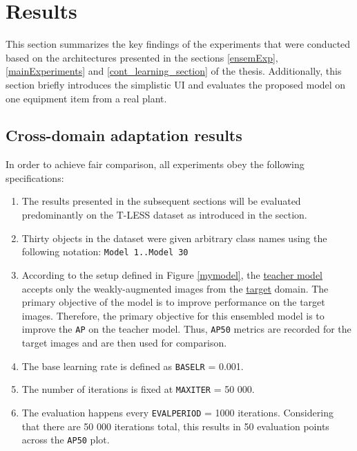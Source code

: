 

\section{Results} 
\label{results} 
This section summarizes the key findings of the experiments that were conducted based on the architectures presented in the sections \ref{ensemExp},  \ref{mainExperiments} and \ref{cont_learning_section} of the thesis. Additionally, this section briefly introduces the simplistic UI and evaluates the proposed model on one equipment item from a real plant. 

\subsection{Cross-domain adaptation results}

In order to achieve fair comparison, all experiments obey the following specifications:
\begin{enumerate}
\item The results presented in the subsequent sections will be evaluated predominantly on the T-LESS dataset as introduced in the  section. 
\item Thirty objects in the dataset were given arbitrary class names using the following notation: \texttt{Model 1..Model 30}
\item According to the setup defined in Figure \ref{mymodel}, the \underline{teacher model} accepts only the weakly-augmented images from the \underline{target} domain. The primary objective of the model is to improve performance on the target images. Therefore, the primary objective for this ensembled model is to improve the \texttt{AP} on the teacher model. Thus, \texttt{AP50} metrics are recorded for the target images and are then used for comparison. 
\item The base learning rate is defined as \texttt{BASE\textunderscore LR} = 0.001.
\item The number of iterations is fixed at \texttt{MAX\textunderscore ITER} = 50 000.
\item The evaluation happens every \texttt{EVAL\textunderscore PERIOD} = 1000 iterations. Considering that there are 50 000 iterations total, this results in 50 evaluation points across the \texttt{AP50} plot.
\end{enumerate}  

